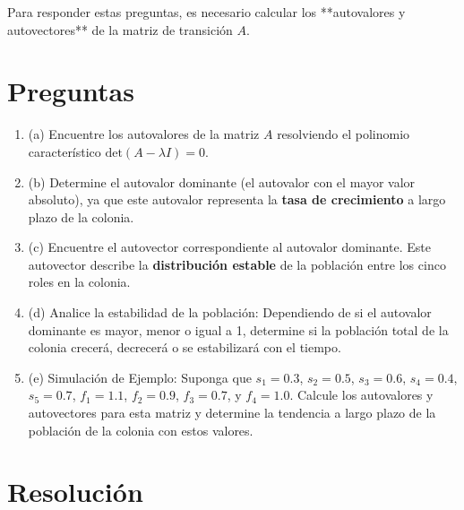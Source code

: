 \documentclass{article}
\begin{document}
Para responder estas preguntas, es necesario calcular los **autovalores y autovectores** de la matriz de transición \( A \).

\section*{Preguntas}

\begin{enumerate}
    \item (a) Encuentre los autovalores de la matriz \( A \) resolviendo el polinomio característico \(\text{det}(A - \lambda I) = 0\).

    \item (b) Determine el autovalor dominante (el autovalor con el mayor valor absoluto), ya que este autovalor representa la \textbf{tasa de crecimiento} a largo plazo de la colonia.

    \item (c) Encuentre el autovector correspondiente al autovalor dominante. Este autovector describe la \textbf{distribución estable} de la población entre los cinco roles en la colonia.

    \item (d) Analice la estabilidad de la población: Dependiendo de si el autovalor dominante es mayor, menor o igual a 1, determine si la población total de la colonia crecerá, decrecerá o se estabilizará con el tiempo.

    \item (e) Simulación de Ejemplo: Suponga que \( s_1 = 0.3 \), \( s_2 = 0.5 \), \( s_3 = 0.6 \), \( s_4 = 0.4 \), \( s_5 = 0.7 \), \( f_1 = 1.1 \), \( f_2 = 0.9 \), \( f_3 = 0.7 \), y \( f_4 = 1.0 \). Calcule los autovalores y autovectores para esta matriz y determine la tendencia a largo plazo de la población de la colonia con estos valores.
\end{enumerate}

\section*{Resolución}
\end{document}
